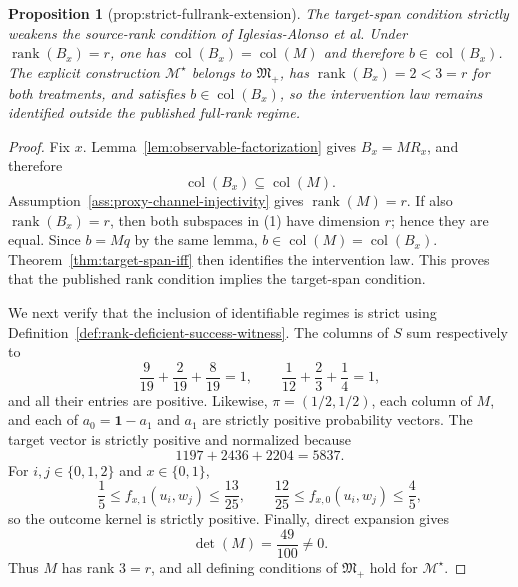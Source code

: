 \documentclass{article}
\newtheorem{proposition}{Proposition}
\begin{document}
\begin{proposition}[prop:strict-fullrank-extension]\label{prop:strict-fullrank-extension}
The target-span condition strictly weakens the source-rank condition of Iglesias-Alonso et al. Under \(\operatorname{rank}(B_x)=r\), one has \(\operatorname{col}(B_x)=\operatorname{col}(M)\) and therefore \(b\in\operatorname{col}(B_x)\). The explicit construction \(\mathcal M^{\star}\) belongs to \(\mathfrak M_{+}\), has \(\operatorname{rank}(B_x)=2<3=r\) for both treatments, and satisfies \(b\in\operatorname{col}(B_x)\), so the intervention law remains identified outside the published full-rank regime.
\end{proposition}
\begin{proof}
Fix \(x\). Lemma~\ref{lem:observable-factorization} gives \(B_x=MR_x\), and therefore
\[
\operatorname{col}(B_x)\subseteq\operatorname{col}(M).
\tag{1}
\]
Assumption~\ref{ass:proxy-channel-injectivity} gives \(\operatorname{rank}(M)=r\). If also \(\operatorname{rank}(B_x)=r\), then both subspaces in (1) have dimension \(r\); hence they are equal. Since \(b=Mq\) by the same lemma, \(b\in\operatorname{col}(M)=\operatorname{col}(B_x)\). Theorem~\ref{thm:target-span-iff} then identifies the intervention law. This proves that the published rank condition implies the target-span condition.

We next verify that the inclusion of identifiable regimes is strict using Definition~\ref{def:rank-deficient-success-witness}. The columns of \(S\) sum respectively to
\[
\frac9{19}+\frac2{19}+\frac8{19}=1,
\qquad
\frac1{12}+\frac23+\frac14=1,
\tag{2}
\]
and all their entries are positive. Likewise, \(\pi=(1/2,1/2)\), each column of \(M\), and each of \(a_0=\mathbf 1-a_1\) and \(a_1\) are strictly positive probability vectors. The target vector is strictly positive and normalized because
\[
1197+2436+2204=5837.
\tag{3}
\]
For \(i,j\in\{0,1,2\}\) and \(x\in\{0,1\}\),
\[
\frac15\le f_{x,1}(u_i,w_j)\le\frac{13}{25},
\qquad
\frac{12}{25}\le f_{x,0}(u_i,w_j)\le\frac45,
\tag{4}
\]
so the outcome kernel is strictly positive. Finally, direct expansion gives
\[
\det(M)=\frac{49}{100}\ne0.
\tag{5}
\]
Thus \(M\) has rank \(3=r\), and all defining conditions of \(\mathfrak M_{+}\) hold for \(\mathcal M^{\star}\).


\end{proof}
\end{document}

